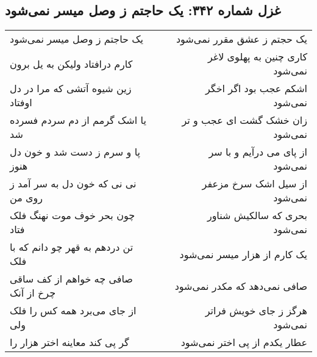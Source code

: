\begin{center}
\section*{غزل شماره ۳۴۲: یک حاجتم ز وصل میسر نمی‌شود}
\label{sec:342}
\begin{longtable}{l p{0.5cm} r}
یک حاجتم ز وصل میسر نمی‌شود
&&
یک حجتم ز عشق مقرر نمی‌شود
\\
کارم درافتاد ولیکن به یل برون
&&
کاری چنین به پهلوی لاغر نمی‌شود
\\
زین شیوه آتشی که مرا در دل اوفتاد
&&
اشکم عجب بود اگر اخگر نمی‌شود
\\
یا اشک گرمم از دم سردم فسرده شد
&&
زان خشک گشت ای عجب و تر نمی‌شود
\\
پا و سرم ز دست شد و خون دل هنوز
&&
از پای می درآیم و با سر نمی‌شود
\\
نی نی که خون دل به سر آمد ز روی من
&&
از سیل اشک سرخ مزعفر نمی‌شود
\\
چون بحر خوف موت نهنگ فلک فتاد
&&
بحری که سالکیش شناور نمی‌شود
\\
تن دردهم به قهر چو دانم که با فلک
&&
یک کارم از هزار میسر نمی‌شود
\\
صافی چه خواهم از کف ساقی چرخ از آنک
&&
صافی نمی‌دهد که مکدر نمی‌شود
\\
از جای می‌برد همه کس را فلک ولی
&&
هرگز ز جای خویش فراتر نمی‌شود
\\
گر پی کند معاینه اختر هزار را
&&
عطار یکدم از پی اختر نمی‌شود
\\
\end{longtable}
\end{center}
